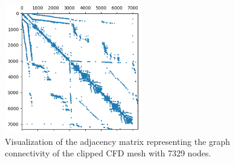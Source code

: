 \begin{figure}[ht]
    \centering
    \includegraphics[width=6cm]{images/Methodology/AdjMatrix.png}
    \caption{Visualization of the adjacency matrix representing the graph connectivity of the clipped CFD mesh with 7329 nodes.}
    \label{adjmat}
\end{figure}

